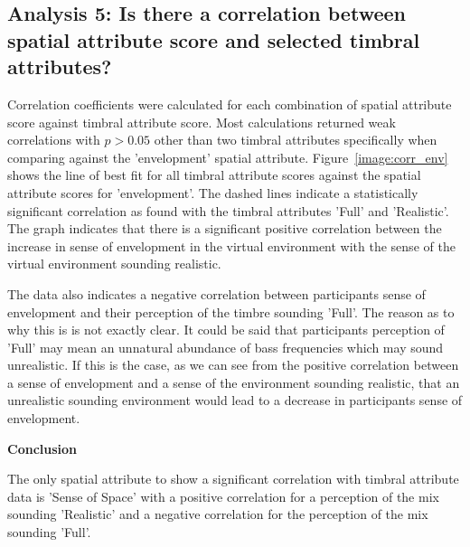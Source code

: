 















\subsection{Analysis 5: Is there a correlation between spatial attribute score and selected timbral attributes?}

	Correlation coefficients were calculated for each combination of spatial attribute score against timbral attribute score. Most calculations returned weak correlations with $p > 0.05$ other than two timbral attributes specifically when comparing against the 'envelopment' spatial attribute. Figure~\ref{image:corr_env} shows the line of best fit for all timbral attribute scores against the spatial attribute scores for 'envelopment'. The dashed lines indicate a statistically significant correlation as found with the timbral attributes 'Full' and 'Realistic'. The graph indicates that there is a significant positive correlation between the increase in sense of envelopment in the virtual environment with the sense of the virtual environment sounding realistic.

	The data also indicates a negative correlation between participants sense of envelopment and their perception of the timbre sounding 'Full'. The reason as to why this is is not exactly clear. It could be said that participants perception of 'Full' may mean an unnatural abundance of bass frequencies which may sound unrealistic. If this is the case, as we can see from the positive correlation between a sense of envelopment and a sense of the environment sounding realistic, that an unrealistic sounding environment would lead to a decrease in participants sense of envelopment. 

	\textbf{Conclusion}

	The only spatial attribute to show a significant correlation with timbral attribute data is 'Sense of Space' with a positive correlation for a perception of the mix sounding 'Realistic' and a negative correlation for the perception of the mix sounding 'Full'.

